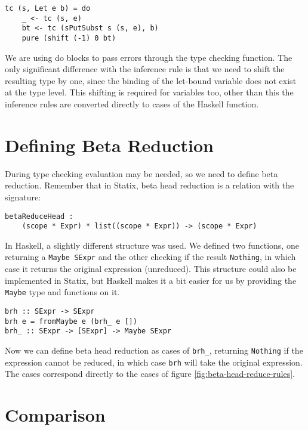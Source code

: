 \begin{lstlisting}
tc (s, Let e b) = do
	_ <- tc (s, e)
	bt <- tc (sPutSubst s (s, e), b)
	pure (shift (-1) 0 bt)
\end{lstlisting}

\begin{mathpar}
\end{mathpar}

We are using do blocks to pass errors through the type checking function. The only significant difference with the inference rule is that we need to shift the resulting type by one, since the binding of the let-bound variable does not exist at the type level. This shifting is required for variables too, other than this the inference rules are converted directly to cases of the Haskell function.

\section{Defining Beta Reduction}

During type checking evaluation may be needed, so we need to define beta reduction. Remember that in Statix, beta head reduction is a relation with the signature:
\begin{lstlisting}
betaReduceHead : 
	(scope * Expr) * list((scope * Expr)) -> (scope * Expr)
\end{lstlisting}

In Haskell, a slightly different structure was used. We defined two functions, one returning a \verb|Maybe SExpr| and the other checking if the result \verb|Nothing|, in which case it returns the original expression (unreduced). This structure could also be implemented in Statix, but Haskell makes it a bit easier for us by providing the \verb|Maybe| type and functions on it.
\begin{lstlisting}
brh :: SExpr -> SExpr
brh e = fromMaybe e (brh_ e [])
brh_ :: SExpr -> [SExpr] -> Maybe SExpr
\end{lstlisting}

Now we can define beta head reduction as cases of \verb|brh_|, returning \verb|Nothing| if the expression cannot be reduced, in which case \verb|brh| will take the original expression. The cases correspond directly to the cases of figure \ref{fig:beta-head-reduce-rules}.

\section{Comparison}

